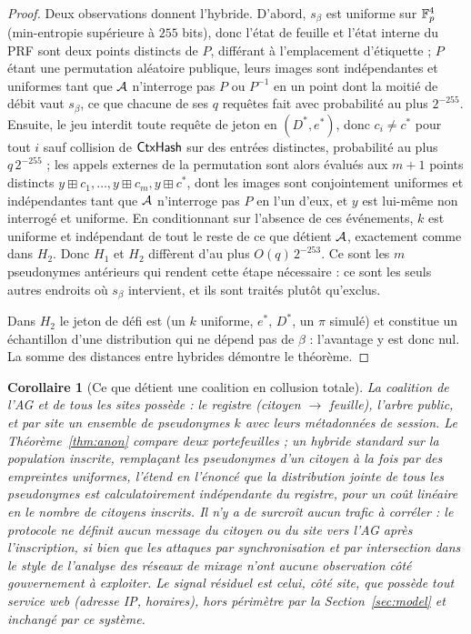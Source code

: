 \documentclass[11pt]{article}
\newtheorem{corollary}{Corollaire}
\theoremstyle{definition}
\begin{document}
\begin{proof}
Deux observations donnent l'hybride. D'abord, $s_\beta$ est uniforme sur $\mathbb{F}_p^4$
(min-entropie supérieure à $255$ bits), donc l'état de feuille et l'état interne du PRF
sont deux points distincts de $P$, différant à l'emplacement d'étiquette ; $P$ étant une
permutation aléatoire publique, leurs images sont indépendantes et uniformes tant que
$\mathcal{A}$ n'interroge pas $P$ ou $P^{-1}$ en un point dont la moitié de débit vaut $s_\beta$,
ce que chacune de ses $q$ requêtes fait avec probabilité au plus $2^{-255}$. Ensuite, le
jeu interdit toute requête de jeton en $(D^*, e^*)$, donc $c_i \ne c^*$ pour tout $i$ sauf
collision de $\mathsf{CtxHash}$ sur des entrées distinctes, probabilité au plus $q\,2^{-255}$ ;
les appels externes de la permutation sont alors évalués aux $m+1$ points distincts $y
\boxplus c_1, \ldots, y \boxplus c_m, y \boxplus c^*$, dont les images sont conjointement
uniformes et indépendantes tant que $\mathcal{A}$ n'interroge pas $P$ en l'un d'eux, et $y$ est
lui-même non interrogé et uniforme. En conditionnant sur l'absence de ces événements, $k$
est uniforme et indépendant de tout le reste de ce que détient $\mathcal{A}$, exactement comme
dans $H_2$. Donc $H_1$ et $H_2$ diffèrent d'au plus $O(q)\,2^{-253}$. Ce sont les $m$
pseudonymes antérieurs qui rendent cette étape nécessaire : ce sont les seuls autres
endroits où $s_\beta$ intervient, et ils sont traités plutôt qu'exclus.

Dans $H_2$ le jeton de défi est (un $k$ uniforme, $e^*$, $D^*$, un $\pi$ simulé) et
constitue un échantillon d'une distribution qui ne dépend pas de $\beta$ : l'avantage y
est donc nul. La somme des distances entre hybrides démontre le théorème.
\end{proof}

\begin{corollary}[Ce que détient une coalition en collusion totale]
La coalition de l'AG et de tous les sites possède : le registre (citoyen $\to$ feuille),
l'arbre public, et par site un ensemble de pseudonymes $k$ avec leurs métadonnées de
session. Le Théorème~\ref{thm:anon} compare deux portefeuilles ; un hybride standard sur
la population inscrite, remplaçant les pseudonymes d'un citoyen à la fois par des
empreintes uniformes, l'étend en l'énoncé que la distribution jointe de tous les
pseudonymes est calculatoirement indépendante du registre, pour un coût linéaire en le
nombre de citoyens inscrits. Il n'y a de surcroît aucun trafic à corréler :
le protocole ne définit aucun message du citoyen ou du site vers l'AG après l'inscription,
si bien que les attaques par synchronisation et par intersection dans le style de
l'analyse des réseaux de mixage n'ont aucune observation côté gouvernement à exploiter. Le
signal résiduel est celui, côté site, que possède tout service web (adresse IP, horaires),
hors périmètre par la Section~\ref{sec:model} et inchangé par ce système.
\end{corollary}
\end{document}

